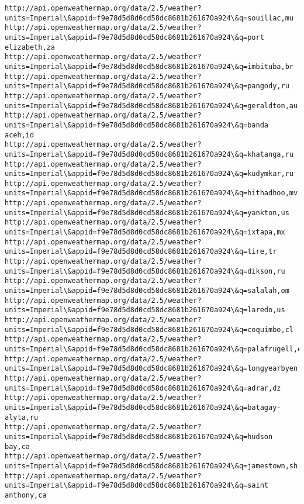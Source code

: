 \documentclass[11pt]{article}
\begin{document}
\begin{Verbatim}[commandchars=\\\{\}]
http://api.openweathermap.org/data/2.5/weather?units=Imperial\&appid=f9e78d5d8d0cd58dc8681b261670a924\&q=souillac,mu
http://api.openweathermap.org/data/2.5/weather?units=Imperial\&appid=f9e78d5d8d0cd58dc8681b261670a924\&q=port elizabeth,za
http://api.openweathermap.org/data/2.5/weather?units=Imperial\&appid=f9e78d5d8d0cd58dc8681b261670a924\&q=imbituba,br
http://api.openweathermap.org/data/2.5/weather?units=Imperial\&appid=f9e78d5d8d0cd58dc8681b261670a924\&q=pangody,ru
http://api.openweathermap.org/data/2.5/weather?units=Imperial\&appid=f9e78d5d8d0cd58dc8681b261670a924\&q=geraldton,au
http://api.openweathermap.org/data/2.5/weather?units=Imperial\&appid=f9e78d5d8d0cd58dc8681b261670a924\&q=banda aceh,id
http://api.openweathermap.org/data/2.5/weather?units=Imperial\&appid=f9e78d5d8d0cd58dc8681b261670a924\&q=khatanga,ru
http://api.openweathermap.org/data/2.5/weather?units=Imperial\&appid=f9e78d5d8d0cd58dc8681b261670a924\&q=kudymkar,ru
http://api.openweathermap.org/data/2.5/weather?units=Imperial\&appid=f9e78d5d8d0cd58dc8681b261670a924\&q=hithadhoo,mv
http://api.openweathermap.org/data/2.5/weather?units=Imperial\&appid=f9e78d5d8d0cd58dc8681b261670a924\&q=yankton,us
http://api.openweathermap.org/data/2.5/weather?units=Imperial\&appid=f9e78d5d8d0cd58dc8681b261670a924\&q=ixtapa,mx
http://api.openweathermap.org/data/2.5/weather?units=Imperial\&appid=f9e78d5d8d0cd58dc8681b261670a924\&q=tire,tr
http://api.openweathermap.org/data/2.5/weather?units=Imperial\&appid=f9e78d5d8d0cd58dc8681b261670a924\&q=dikson,ru
http://api.openweathermap.org/data/2.5/weather?units=Imperial\&appid=f9e78d5d8d0cd58dc8681b261670a924\&q=salalah,om
http://api.openweathermap.org/data/2.5/weather?units=Imperial\&appid=f9e78d5d8d0cd58dc8681b261670a924\&q=laredo,us
http://api.openweathermap.org/data/2.5/weather?units=Imperial\&appid=f9e78d5d8d0cd58dc8681b261670a924\&q=coquimbo,cl
http://api.openweathermap.org/data/2.5/weather?units=Imperial\&appid=f9e78d5d8d0cd58dc8681b261670a924\&q=palafrugell,es
http://api.openweathermap.org/data/2.5/weather?units=Imperial\&appid=f9e78d5d8d0cd58dc8681b261670a924\&q=longyearbyen,sj
http://api.openweathermap.org/data/2.5/weather?units=Imperial\&appid=f9e78d5d8d0cd58dc8681b261670a924\&q=adrar,dz
http://api.openweathermap.org/data/2.5/weather?units=Imperial\&appid=f9e78d5d8d0cd58dc8681b261670a924\&q=batagay-alyta,ru
http://api.openweathermap.org/data/2.5/weather?units=Imperial\&appid=f9e78d5d8d0cd58dc8681b261670a924\&q=hudson bay,ca
http://api.openweathermap.org/data/2.5/weather?units=Imperial\&appid=f9e78d5d8d0cd58dc8681b261670a924\&q=jamestown,sh
http://api.openweathermap.org/data/2.5/weather?units=Imperial\&appid=f9e78d5d8d0cd58dc8681b261670a924\&q=saint anthony,ca

\end{Verbatim}
\end{document}
